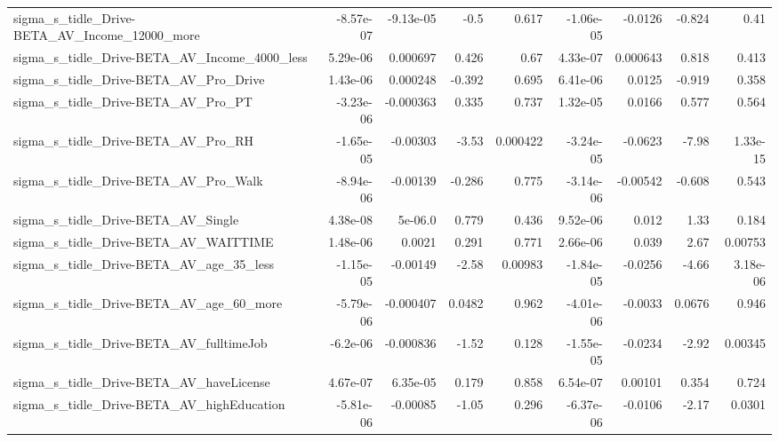 \begin{tabular}{lrrrrrrrr}
sigma\_s\_tidle\_Drive-BETA\_AV\_Income\_12000\_more      &   -8.57e-07 &    -9.13e-05 &      -0.5 &    0.617 &  -1.06e-05 &     -0.0126 &       -0.824 &          0.41 \\
sigma\_s\_tidle\_Drive-BETA\_AV\_Income\_4000\_less       &    5.29e-06 &     0.000697 &     0.426 &     0.67 &   4.33e-07 &    0.000643 &        0.818 &         0.413 \\
sigma\_s\_tidle\_Drive-BETA\_AV\_Pro\_Drive              &    1.43e-06 &     0.000248 &    -0.392 &    0.695 &   6.41e-06 &      0.0125 &       -0.919 &         0.358 \\
sigma\_s\_tidle\_Drive-BETA\_AV\_Pro\_PT                 &   -3.23e-06 &    -0.000363 &     0.335 &    0.737 &   1.32e-05 &      0.0166 &        0.577 &         0.564 \\
sigma\_s\_tidle\_Drive-BETA\_AV\_Pro\_RH                 &   -1.65e-05 &     -0.00303 &     -3.53 & 0.000422 &  -3.24e-05 &     -0.0623 &        -7.98 &      1.33e-15 \\
sigma\_s\_tidle\_Drive-BETA\_AV\_Pro\_Walk               &   -8.94e-06 &     -0.00139 &    -0.286 &    0.775 &  -3.14e-06 &    -0.00542 &       -0.608 &         0.543 \\
sigma\_s\_tidle\_Drive-BETA\_AV\_Single                 &    4.38e-08 &      5e-06.0 &     0.779 &    0.436 &   9.52e-06 &       0.012 &         1.33 &         0.184 \\
sigma\_s\_tidle\_Drive-BETA\_AV\_WAITTIME               &    1.48e-06 &       0.0021 &     0.291 &    0.771 &   2.66e-06 &       0.039 &         2.67 &       0.00753 \\
sigma\_s\_tidle\_Drive-BETA\_AV\_age\_35\_less            &   -1.15e-05 &     -0.00149 &     -2.58 &  0.00983 &  -1.84e-05 &     -0.0256 &        -4.66 &      3.18e-06 \\
sigma\_s\_tidle\_Drive-BETA\_AV\_age\_60\_more            &   -5.79e-06 &    -0.000407 &    0.0482 &    0.962 &  -4.01e-06 &     -0.0033 &       0.0676 &         0.946 \\
sigma\_s\_tidle\_Drive-BETA\_AV\_fulltimeJob            &    -6.2e-06 &    -0.000836 &     -1.52 &    0.128 &  -1.55e-05 &     -0.0234 &        -2.92 &       0.00345 \\
sigma\_s\_tidle\_Drive-BETA\_AV\_haveLicense            &    4.67e-07 &     6.35e-05 &     0.179 &    0.858 &   6.54e-07 &     0.00101 &        0.354 &         0.724 \\
sigma\_s\_tidle\_Drive-BETA\_AV\_highEducation          &   -5.81e-06 &     -0.00085 &     -1.05 &    0.296 &  -6.37e-06 &     -0.0106 &        -2.17 &        0.0301 \\

\end{tabular}
